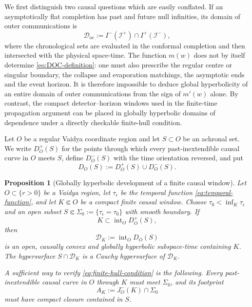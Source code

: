\documentclass[11pt,a4paper]{article}
\newtheorem{proposition}[theorem]{Proposition}
\theoremstyle{definition}
\theoremstyle{remark}
\newcommand{\D}{\mathcal D}
\newcommand{\scrI}{\mathscr I}
\begin{document}
	We first distinguish two causal questions which are easily conflated.  If an
	asymptotically flat completion has past and future null infinities, its domain
	of outer communications is
	\begin{equation}
		\D_{\mathrm{oc}}
		:=I^-(\scrI^+)\cap I^+(\scrI^-),
		\label{eq:DOC-definition}
	\end{equation}
	where the chronological sets are evaluated in the conformal completion and
	then intersected with the physical space-time.  The function $m(w)$ does not
	by itself determine \eqref{eq:DOC-definition}: one must also prescribe the
	regular centre or singular boundary, the collapse and evaporation matchings,
	the asymptotic ends and the event horizon.  It is therefore impossible to
	deduce global hyperbolicity of an entire domain of outer communications from
	the sign of $m'(w)$ alone.  By contrast, the compact detector--horizon windows
	used in the finite-time propagation argument can be placed in globally
	hyperbolic domains of dependence under a directly checkable finite-hull
	condition.
	
	Let $O$ be a regular Vaidya coordinate region and let $S\subset O$ be an
	achronal set.  We write $D_O^+(S)$ for the points through which every
	past-inextendible causal curve in $O$ meets $S$, define $D_O^-(S)$ with the
	time orientation reversed, and put
	\begin{equation}
		D_O(S):=D_O^+(S)\cup D_O^-(S).
		\label{eq:domain-of-dependence}
	\end{equation}
	
	\begin{proposition}[Globally hyperbolic development of a finite causal window]
		\label{prop:local-global-hyperbolicity}
		Let $O\subset\{r>0\}$ be a Vaidya region, let
		$\tau_\epsilon$ be the temporal function
		\eqref{eq:temporal-function}, and let $K\Subset O$ be a compact finite causal
		window.  Choose $\tau_0<\inf_K\tau_\epsilon$ and an open subset
		$S\Subset\Sigma_0:=\{\tau_\epsilon=\tau_0\}$ with smooth boundary.  If
		\begin{equation}
			K\subset\operatorname{int}_O D_O^+(S),
			\label{eq:finite-hull-condition}
		\end{equation}
		then
		\begin{equation}
			\D_K:=\operatorname{int}_O D_O(S)
			\label{eq:finite-development}
		\end{equation}
		is an open, causally convex and globally hyperbolic subspace-time containing
		$K$.  The hypersurface $S\cap\D_K$ is a Cauchy hypersurface of $\D_K$.
		
		A sufficient way to verify \eqref{eq:finite-hull-condition} is the following.
		Every past-inextendible causal curve in $O$ through $K$ must meet $\Sigma_0$,
		and its footprint
		\begin{equation}
			A_K:=J_O^-(K)\cap\Sigma_0
			\label{eq:causal-footprint}
		\end{equation}
		must have compact closure contained in $S$.
	\end{proposition}
	
\end{document}
